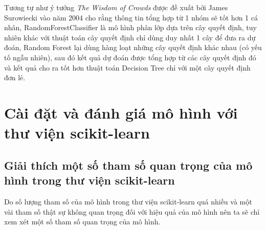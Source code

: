 \documentclass[conference]{IEEEtran}
\begin{document}
Tương tự như ý tưởng \emph{The Wisdom of Crowds} được đề xuất bởi James Surowiecki vào năm 2004 cho rằng thông tin tổng hợp từ 1 nhóm sẽ tốt hơn 1 cá nhân, RandomForestClassifier là mô hình phân lớp dựa trên cây quyết định, tuy nhiên khác với thuật toán cây quyết định chỉ dùng duy nhất 1 cây để đưa ra dự đoán, Random Forest lại dùng hàng loạt những cây quyết định khác nhau (có yếu tố ngẫu nhiên), sau đó kết quả dự đoán được tổng hợp từ các cây quyết định đó và kết quả cho ra tốt hơn thuật toán Decision Tree chỉ với một cây quyết định đơn lẻ. 

\section{Cài đặt và đánh giá mô hình với thư viện scikit-learn}
\subsection{Giải thích một số tham số quan trọng của mô hình trong thư viện scikit-learn}
Do số lượng tham số của mô hình trong thư viện scikit-learn quá nhiều và một vài tham số thật sự không quan trọng đối với hiệu quả của mô hình nên ta sẽ chỉ xem xét một số tham số quan trọng của mô hình.
\end{document}
